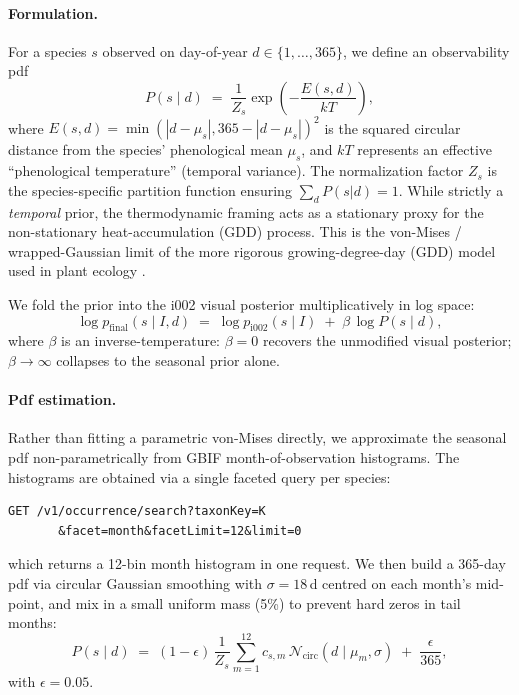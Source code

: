 \documentclass[10pt,twocolumn,letterpaper]{article}
\begin{document}
\paragraph{Formulation.} For a species $s$ observed on day-of-year $d \in \{1,\ldots,365\}$, we define an observability pdf
\begin{equation}
    P(s \mid d) \;=\; \frac{1}{Z_s} \exp\!\left(-\frac{E(s, d)}{kT}\right),
\end{equation}
where $E(s, d) = \min(|d - \mu_s|, 365 - |d - \mu_s|)^2$ is the squared circular distance from the species' phenological mean $\mu_s$, and $kT$ represents an effective ``phenological temperature'' (temporal variance). The normalization factor $Z_s$ is the species-specific partition function ensuring $\sum_d P(s|d) = 1$. While strictly a \emph{temporal} prior, the thermodynamic framing acts as a stationary proxy for the non-stationary heat-accumulation (GDD) process. This is the von-Mises / wrapped-Gaussian limit of the more rigorous growing-degree-day (GDD) model used in plant ecology \cite{macarthur_wilson}.

We fold the prior into the i002 visual posterior multiplicatively in log space:
\begin{equation}
    \log p_{\text{final}}(s \mid I, d) \;=\; \log p_{\text{i002}}(s \mid I) \;+\; \beta \,\log P(s \mid d),
\end{equation}
where $\beta$ is an inverse-temperature: $\beta{=}0$ recovers the unmodified visual posterior; $\beta\!\to\!\infty$ collapses to the seasonal prior alone.

\paragraph{Pdf estimation.} Rather than fitting a parametric von-Mises directly, we approximate the seasonal pdf non-parametrically from GBIF month-of-observation histograms. The histograms are obtained via a single faceted query per species:
\begin{verbatim}
GET /v1/occurrence/search?taxonKey=K
       &facet=month&facetLimit=12&limit=0
\end{verbatim}
which returns a 12-bin month histogram in one request. We then build a 365-day pdf via circular Gaussian smoothing with $\sigma = 18$\,d centred on each month's mid-point, and mix in a small uniform mass (5\%) to prevent hard zeros in tail months:
\begin{equation}
    P(s \mid d) \;=\; (1{-}\epsilon)\, \frac{1}{Z_s} \sum_{m=1}^{12} c_{s,m}\,\mathcal{N}_{\text{circ}}\!\left(d \mid \mu_m, \sigma\right) \;+\; \frac{\epsilon}{365},
\end{equation}
with $\epsilon{=}0.05$.
\end{document}
